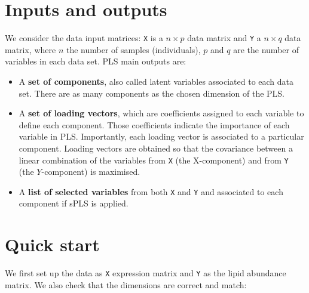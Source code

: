 \documentclass[]{book}
\newenvironment{Shaded}{\begin{snugshade}}{\end{snugshade}}
\newcommand{\KeywordTok}[1]{\textcolor[rgb]{0.13,0.29,0.53}{\textbf{#1}}}
\newcommand{\StringTok}[1]{\textcolor[rgb]{0.31,0.60,0.02}{#1}}
\newcommand{\OperatorTok}[1]{\textcolor[rgb]{0.81,0.36,0.00}{\textbf{#1}}}
\newcommand{\NormalTok}[1]{#1}
\theoremstyle{definition}
\theoremstyle{definition}
\theoremstyle{definition}
\theoremstyle{remark}
\begin{document}
\section{Inputs and outputs}\label{inputs-and-outputs-1}

We consider the data input matrices: \texttt{X} is a \(n \times p\) data
matrix and \texttt{Y} a \(n \times q\) data matrix, where \(n\) the
number of samples (individuals), \(p\) and \(q\) are the number of
variables in each data set. PLS main outputs are:

\begin{itemize}
\item
  A \textbf{set of components}, also called latent variables associated
  to each data set. There are as many components as the chosen dimension
  of the PLS.
\item
  A \textbf{set of loading vectors}, which are coefficients assigned to
  each variable to define each component. Those coefficients indicate
  the importance of each variable in PLS. Importantly, each loading
  vector is associated to a particular component. Loading vectors are
  obtained so that the covariance between a linear combination of the
  variables from \texttt{X} (the X-component) and from \texttt{Y} (the
  \(Y\)-component) is maximised.
\item
  A \textbf{list of selected variables} from both \texttt{X} and
  \texttt{Y} and associated to each component if sPLS is applied.
\end{itemize}

\section{Quick start}\label{quick-start-2}

We first set up the data as \texttt{X} expression matrix and \texttt{Y}
as the lipid abundance matrix. We also check that the dimensions are
correct and match:

\begin{Shaded}
\end{Shaded}
\end{document}
